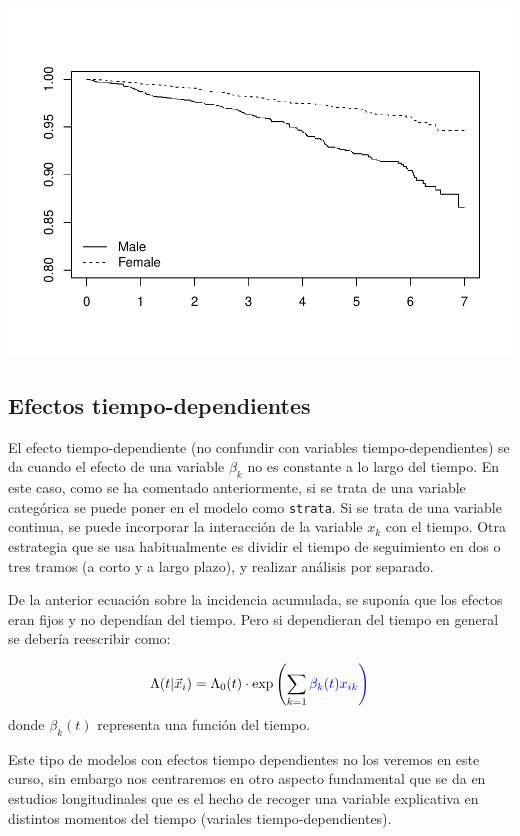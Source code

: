 \documentclass[
]{book}
\begin{document}
\includegraphics{fig_out/unnamed-chunk-161-1.pdf}

\hypertarget{efectos-tiempo-dependientes}{%
\subsection{Efectos tiempo-dependientes}\label{efectos-tiempo-dependientes}}

El efecto tiempo-dependiente (no confundir con variables tiempo-dependientes) se da cuando el efecto de una variable \(\beta_k\) no es constante a lo largo del tiempo. En este caso, como se ha comentado anteriormente, si se trata de una variable categórica se puede poner en el modelo como \texttt{strata}. Si se trata de una variable continua, se puede incorporar la interacción de la variable \(x_k\) con el tiempo.
Otra estrategia que se usa habitualmente es dividir el tiempo de seguimiento en dos o tres tramos (a corto y a largo plazo), y realizar análisis por separado.

De la anterior ecuación sobre la incidencia acumulada, se suponía que los efectos eran fijos y no dependían del tiempo. Pero si dependieran del tiempo en general se debería reescribir como:

\[\Lambda(t|\vec{x}_i) = \Lambda_0(t)\cdot \text{exp}\left(\sum_{k=1} \color{blue}{\beta_k(t)} x_{ik}\right)\]
donde \(\beta_k(t)\) representa una función del tiempo.

Este tipo de modelos con efectos tiempo dependientes no los veremos en este curso, sin embargo nos centraremos en otro aspecto fundamental que se da en estudios longitudinales que es el hecho de recoger una variable explicativa en distintos momentos del tiempo (variales tiempo-dependientes).
\end{document}
